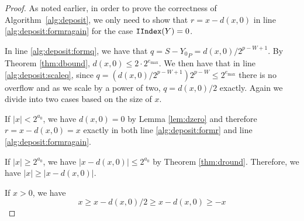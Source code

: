 \begin{proof}
\begin{comment}
        Next, we show that $S - {Y_0}_P = d(x, 0)/2^{p - W + 1}$.

        We divide into two cases based on the size of $x$.

        If $|x| < 2^{a_0} = 2^{e_{\max} + 1 - W}$, then we have $|r| < 2^{a_0 - p + W - 1}$ in line \ref{alg:deposit:scaler} regardless of whether or not there is underflow in the division as we scale by a power of two.
         Therefore, since $|r| < 2^{a_0 - p + W - 1}$, $S - {Y_0}_P = \roundtonearestinfty(r, a_0 - p + W) = 0 = d(x, 0)/2^{p - W - 1}$ by Lemma \ref{lem:dzero}.

        If $|x| \geq 2^{a_0}= 2^{e_{\max} + 1 - W}$, then there is no underflow in line \ref{alg:deposit:scaler} and $r = x / 2^{p - W + 1}$ exactly as we scale by a power of two. Therefore, $S - {Y_0}_P = \roundtonearestinfty(x/2^{p - W + 1}, a_0 - p + W) = d(x, 0)/2^{p - W + 1}$

        At this point, all that remains to be shown is that $r = x - d(x, 0)$ in line \ref{alg:deposit:formragain}. 
        \end{comment}

        As noted earlier, in order to prove the correctness of Algorithm~\ref{alg:deposit},
        we only need to show that $r = x - d(x, 0)$ in line \ref{alg:deposit:formragain} 
        for the case $\mathtt{IIndex}(Y) = 0$.

        In line \ref{alg:deposit:formq}, we have that
        \(
            q = S - {Y_0}_P = d(x,0)/2^{p - W + 1}.
        \)
        By Theorem \ref{thm:dbound}, $d(x, 0) \leq 2 \cdot
        2^{e_{\max}}$. We then have that in line \ref{alg:deposit:scaleq},
        since $q = (d(x, 0)/2^{p - W + 1})2^{p - W} \leq 2^{e_{\max}}$ there is
        no overflow and as we scale by a power of two, $q = d(x, 0)/2$ exactly.
        Again we divide into two cases based on the size of $x$.

        If $|x| < 2^{a_0}$, we have $d(x, 0) = 0$ by Lemma \ref{lem:dzero} and therefore
        $r = x - d(x, 0) = x$ exactly in both line \ref{alg:deposit:formr}
        and line \ref{alg:deposit:formragain}.

        If $|x| \geq 2^{a_0}$, we have $|x - d(x, 0)| \leq 2^{a_0}$ by Theorem \ref{thm:dround}.
        Therefore, we have $|x| \geq |x - d(x, 0)|$. 

        If $x > 0$, we have
        \begin{equation*}
          x \geq x - d(x, 0)/2 \geq x - d(x, 0) \geq -x
        \end{equation*}


\end{proof}
